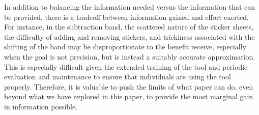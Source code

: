 \documentclass{sig-alternate}
\begin{document}
In addition to balancing the information needed versus the information that can be provided, there is a tradeoff between information gained and effort exerted. For instance, in the subtraction band, the scattered nature of the sticker sheets, the difficulty of adding and removing stickers, and trickiness associated with the shifting of the band may be disproportionate to the benefit receive, especially when the goal is not precision, but is instead a suitably accurate approximation. This is especially difficult given the extended training of the tool and periodic evaluation and maintenance to ensure that individuals are using the tool properly. Therefore, it is valuable to push the limits of what paper can do, even beyond what we have explored in this paper, to provide the most marginal gain in information possible.


\end{document}
